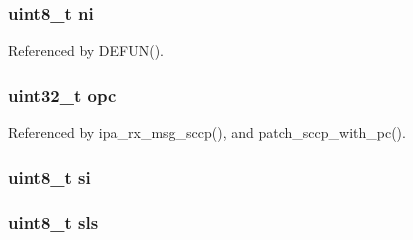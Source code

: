 \subsubsection[{ni}]{\setlength{\rightskip}{0pt plus 5cm}uint8\+\_\+t ni}\label{m3ua_8h_a3b04709c8003a4df9c63964cbac68647}


Referenced by D\+E\+F\+U\+N().

\subsubsection[{opc}]{\setlength{\rightskip}{0pt plus 5cm}uint32\+\_\+t opc}\label{m3ua_8h_a8fbf08c14ea8fd895e011bc6d031fd24}


Referenced by ipa\+\_\+rx\+\_\+msg\+\_\+sccp(), and patch\+\_\+sccp\+\_\+with\+\_\+pc().

\subsubsection[{si}]{\setlength{\rightskip}{0pt plus 5cm}uint8\+\_\+t si}\label{m3ua_8h_a2a79950c427b4456a4ff4c87fe623938}
\subsubsection[{sls}]{\setlength{\rightskip}{0pt plus 5cm}uint8\+\_\+t sls}\label{m3ua_8h_a63dfbd9d79ea816f1c524a30cd86596b}
